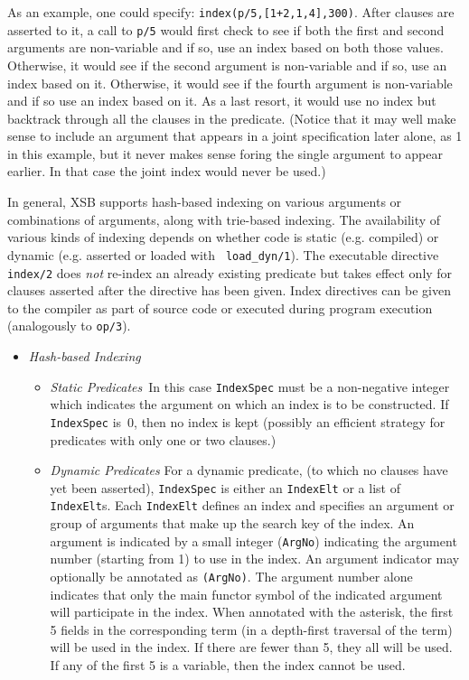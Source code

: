 \begin{description}
{As an example, one could specify: {\tt index(p/5,[1+2,1,4],300)}.
After clauses are asserted to it, a call to {\tt p/5} would first
check to see if both the first and second arguments are non-variable
and if so, use an index based on both those values. Otherwise, it
would see if the second argument is non-variable and if so, use an
index based on it. Otherwise, it would see if the fourth argument is
non-variable and if so use an index based on it. As a last resort, it would
use no index but backtrack through all the clauses in the predicate.
(Notice that it may well make sense to include an argument that 
appears in a joint specification later alone, as 1 in this example,
but it never makes sense foring the single argument to appear earlier. In
that case the joint index would never be used.)

}

\label{index_dynamic} 

In general, XSB supports hash-based indexing on various arguments or
combinations of arguments, along with trie-based indexing.  The
availability of various kinds of indexing depends on whether code is
static (e.g. compiled) or dynamic (e.g. asserted or loaded with {\tt
load\_dyn/1}).  The executable directive {\tt index/2} does {\em
not\/} re-index an already existing predicate but takes effect only
for clauses asserted after the directive has been given.  Index
directives can be given to the compiler as part of source code or
executed during program execution (analogously to {\tt op/3}).

\begin{itemize}
\item {\em Hash-based Indexing} 
\begin{itemize}
\item {\em Static Predicates}\ 
In this case {\tt IndexSpec} must be a non-negative integer which
indicates the argument on which an index is to be constructed.  If
{\tt IndexSpec} is~0, then no index is kept (possibly an efficient
strategy for predicates with only one or two clauses.)
\item {\em Dynamic Predicates}
For a dynamic predicate, (to which no clauses have yet been asserted),
{\tt IndexSpec} is either an {\tt IndexElt} or a list of {\tt
IndexElt}s.  Each {\tt IndexElt} defines an index and specifies an argument or group of
arguments that make up the search key of the index.  An argument is
indicated by a small integer ({\tt ArgNo}) indicating the argument number (starting
from 1) to use in the index.  An argument indicator may optionally be annotated
as {\tt *(ArgNo)}.  The argument number alone indicates that only the
main functor symbol of the indicated argument will participate in the
index.  When annotated with the asterisk, the first 5 fields in the
corresponding term (in a depth-first traversal of the term) will be
used in the index.  If there are fewer than 5, they all will be used.
If any of the first 5 is a variable, then the index cannot be used.


\end{itemize}
\end{itemize}
\end{description}
